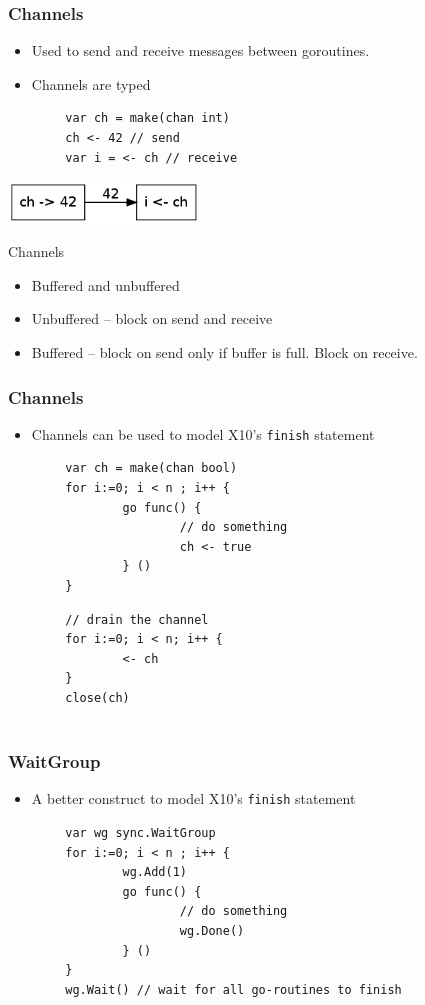 \documentclass{beamer}
\begin{document}
\begin{frame} [fragile]
\frametitle{Channels}
\begin{itemize}
\item Used to send and receive messages between goroutines.
\item Channels are typed
\end{itemize}
\begin{verbatim}
        var ch = make(chan int) 
        ch <- 42 // send 
        var i = <- ch // receive        
\end{verbatim}
\begin{center}
\includegraphics[width=2in]{channel.png}
\end{center}
\end{frame}

\begin{frame}{Channels}

\begin{itemize}
\item Buffered and unbuffered
\item Unbuffered -- block on send and receive
\item Buffered  -- block on send only if buffer is full. Block on receive.

\end{itemize}
\end{frame}

\begin{frame}[fragile]
\frametitle{Channels}
\begin{itemize}
\item Channels can be used to model X10's \verb=finish= statement
\end{itemize}
\begin{verbatim}
        var ch = make(chan bool)
        for i:=0; i < n ; i++ {
                go func() { 
                        // do something
                        ch <- true
                } ()
        }
\end{verbatim}
\pause
\begin{verbatim}
        // drain the channel
        for i:=0; i < n; i++ {
                <- ch
        }
        close(ch)
        
\end{verbatim}
\end{frame}


\begin{frame} [fragile]
\frametitle{WaitGroup}
\begin{itemize}
\item A better construct to model X10's \verb=finish= statement
\end{itemize}
\begin{verbatim}
        var wg sync.WaitGroup
        for i:=0; i < n ; i++ {
                wg.Add(1)
                go func() { 
                        // do something
                        wg.Done()
                } ()                
        }
        wg.Wait() // wait for all go-routines to finish
\end{verbatim}
\end{frame}
\end{document}
